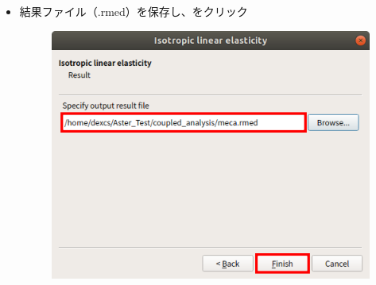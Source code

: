 \begin{itemize}
\begin{figure}[H]
	      \end{figure}
	      \clearpage
	\item 結果ファイル（.rmed）を保存し、をクリック
	      \begin{figure}[H]
		      \centering
		      \includegraphics{fig/meca007.png}
	      \end{figure}
\end{itemize}
\clearpage
